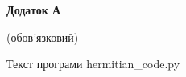 \documentclass[a4paper,12pt,oneside]{article}
\begin{document}
\begin{center}
\textbf{Додаток А}

(обов'язковий)

Текст програми hermitian\_code.py
\end{center}

\end{document}
